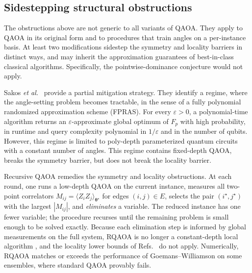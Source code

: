 \documentclass[twocolumn,
english,
aps,
pra,
10pt,
longbibliography,
superscriptaddress,
amsmath,
amssymb,
floatfix
]{revtex4-2}
\begin{document}
\subsection{Sidestepping structural obstructions}

The obstructions above are not generic to all variants of QAOA.
They apply to QAOA in its original form and to procedures that train angles on a per-instance basis.
At least two modifications sidestep the symmetry and locality  barriers in distinct ways, and may inherit the approximation guarantees of best-in-class classical algorithms.
Specifically, the pointwise-dominance conjecture \cite{BarakMarwaha2022} would not apply.

Sakos \emph{et al.}~\cite{sakos2026global} provide a partial mitigation strategy. 
They identify a regime, where the angle-setting problem becomes tractable, in the sense of a fully polynomial randomized approximation scheme (FPRAS). 
For every $\varepsilon>0$, a polynomial-time algorithm returns an $\varepsilon$-approximate global optimum of $F_p$ with high probability, in runtime and query complexity polynomial in $1/\varepsilon$ and in the number of qubits. 
However, this regime is limited to poly-depth parameterized quantum circuits with a constant number of angles. This regime contains fixed-depth QAOA, breaks the symmetry barrier, but does not break  the locality barrier. 

Recursive QAOA \cite{Bravyi2020,BravyiKlieschKoenigTang2022} remedies the symmetry and locality obstructions.
At each round, one runs a low-depth QAOA on the current instance, measures all two-point correlators $M_{ij}=\langle Z_iZ_j\rangle_{\boldsymbol{\theta}^\star}$ for edges $(i,j)\in E$, selects the pair $(i^\star,j^\star)$ with the largest $|M_{ij}|$, and \emph{eliminates} a variable.
The reduced instance has one fewer variable; the procedure recurses until the remaining problem is small enough to be solved exactly.
Because each elimination step is informed by global measurements on the full system, RQAOA is no longer a constant-depth local algorithm \cite{Hatami2014}, and the locality lower bounds of Refs.~\cite{BravyiKlieschKoenigTang2022, BarakMarwaha2022} do not apply.
Numerically, RQAOA matches or exceeds the performance of Goemans--Williamson on some ensembles, where standard QAOA provably fails.
\end{document}

